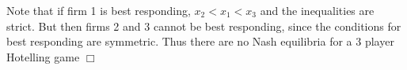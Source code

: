 \documentclass{article}
\newcommand{\contra}{\raisebox{\depth}{\#}}
\begin{document}
\noindent Note that if firm 1 is best responding, $x_2 < x_1 < x_3$ and the inequalities are strict. But then firms 2 and 3 cannot be best responding, since the conditions for best responding are symmetric. Thus there are no Nash equilibria for a 3 player Hotelling game $\Box$
\end{document}

